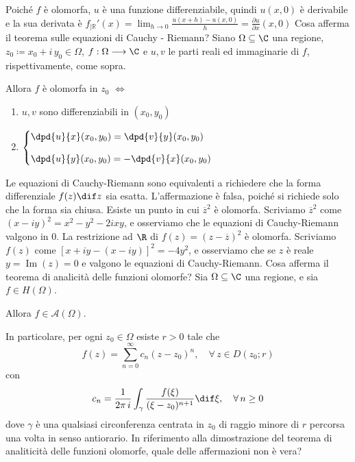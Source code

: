     Poiché $f$ è olomorfa, $u$ è una funzione differenziabile, quindi $u(x,0)$ è derivabile e la sua derivata è 
    $f_{| \mathbb{R}}'(x) = \lim_{h \to 0} \frac{u(x+h) - u(x,0)}{h} = \frac{\partial u}{\partial x}(x,0)$
    Cosa afferma il teorema sulle equazioni di Cauchy - Riemann?
Siano $ \Omega \subseteq \C $ una regione, $ z_0 \coloneqq x_0+i\,y_0 \in \Omega $, $ f:\Omega\longrightarrow \C $ e $ u,v $ le parti reali ed immaginarie di $ f $, rispettivamente, come sopra.

Allora $ f $ è olomorfa in $ z_0 $ $ \iff $ 
\begin{enumerate}
    \item $ u,v $ sono differenziabili in $ (x_0,y_0) $
    \item $ \displaystyle \begin{cases}
        \dpd{u}{x}(x_0,y_0) = \dpd{v}{y}(x_0,y_0)\\[2ex]
        \dpd{u}{y}(x_0,y_0) = -\dpd{v}{x}(x_0,y_0)
    \end{cases} $
\end{enumerate}
Le equazioni di Cauchy-Riemann sono equivalenti a richiedere che la forma differenziale $f(z) \dif z$ sia esatta.
    L'affermazione è falsa, poiché si richiede solo che la forma sia chiusa.
Esiste un punto in cui $\overline{z}^2$ è olomorfa.
Scriviamo $\overline{z}^2$ come $(x-iy)^2=x^2-y^2-2ixy$, e osserviamo che le equazioni di Cauchy-Riemann valgono in $0$.
    La restrizione ad $ \R $ di $f(z)=(z-\overline{z})^2$ è olomorfa.
Scriviamo $f(z)$ come $[x+iy-(x-iy)]^2=-4y^2$, e osserviamo che se $ z $ è reale $y=\operatorname{Im}(z)=0$ e valgono le equazioni di Cauchy-Riemann.
    Cosa afferma il teorema di analicità delle funzioni olomorfe?
    Sia $\Omega \subseteq \C$ una regione, e sia $ f \in H(\Omega) $. 
        
    Allora $ f \in \mathcal{A}(\Omega) $. 

    In particolare, per ogni $ z_0 \in \Omega$ esiste $ r>0 $ tale che \[
        f(z)= \displaystyle \sum_{n=0}^{\infty} c_{n}(z-z_0)^{n},\quad \forall\, z \in D(z_0;r) 
    \]con \[
        c_{n}=\frac{1}{2\pi\,i} \int_{\gamma} \frac{f(\xi)}{(\xi-z_0)^{n+1}}\dif \xi ,\quad \forall\, n\ge 0  
    \]dove $\gamma$ è una qualsiasi circonferenza centrata in $ z_0 $ di raggio minore di $ r $ percorsa una volta in senso antiorario.
    In riferimento alla dimostrazione del teorema di analiticità delle funzioni olomorfe, quale delle affermazioni non è vera?

